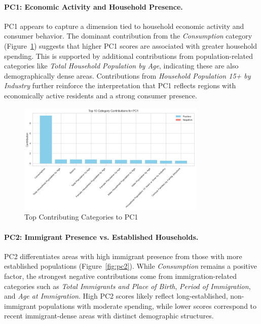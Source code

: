 \documentclass{article}
\begin{document}
\paragraph{PC1: Economic Activity and Household Presence.}  
PC1 appears to capture a dimension tied to household economic activity and consumer behavior. The dominant contribution from the \textit{Consumption} category (Figure~\ref{fig:pc1}) suggests that higher PC1 scores are associated with greater household spending. This is supported by additional contributions from population-related categories like \textit{Total Household Population by Age}, indicating these are also demographically dense areas. Contributions from \textit{Household Population 15+ by Industry} further reinforce the interpretation that PC1 reflects regions with economically active residents and a strong consumer presence.

\begin{figure}[H]
    \centering
    \includegraphics[width=0.8\textwidth]{figures/pc1_contribs.png}
    \caption{Top Contributing Categories to PC1}
    \label{fig:pc1}
\end{figure}

\paragraph{PC2: Immigrant Presence vs. Established Households.}  
PC2 differentiates areas with high immigrant presence from those with more established populations (Figure~\ref{fig:pc2}). While \textit{Consumption} remains a positive factor, the strongest negative contributions come from immigration-related categories such as \textit{Total Immigrants and Place of Birth}, \textit{Period of Immigration}, and \textit{Age at Immigration}. High PC2 scores likely reflect long-established, non-immigrant populations with moderate spending, while lower scores correspond to recent immigrant-dense areas with distinct demographic structures.
\end{document}
